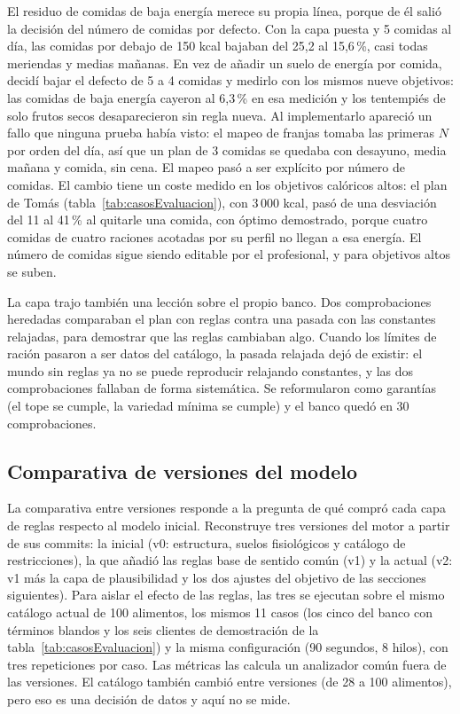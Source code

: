 El residuo de comidas de baja energía merece su propia línea, porque de él salió la decisión del número de comidas por defecto. Con la capa puesta y 5 comidas al día, las comidas por debajo de 150 kcal bajaban del 25,2 al 15,6\,\%, casi todas meriendas y medias mañanas. En vez de añadir un suelo de energía por comida, decidí bajar el defecto de 5 a 4 comidas y medirlo con los mismos nueve objetivos: las comidas de baja energía cayeron al 6,3\,\% en esa medición y los tentempiés de solo frutos secos desaparecieron sin regla nueva. Al implementarlo apareció un fallo que ninguna prueba había visto: el mapeo de franjas tomaba las primeras $N$ por orden del día, así que un plan de 3 comidas se quedaba con desayuno, media mañana y comida, sin cena. El mapeo pasó a ser explícito por número de comidas. El cambio tiene un coste medido en los objetivos calóricos altos: el plan de Tomás (tabla~\ref{tab:casosEvaluacion}), con 3\,000 kcal, pasó de una desviación del 11 al 41\,\% al quitarle una comida, con óptimo demostrado, porque cuatro comidas de cuatro raciones acotadas por su perfil no llegan a esa energía. El número de comidas sigue siendo editable por el profesional, y para objetivos altos se suben.

La capa trajo también una lección sobre el propio banco. Dos comprobaciones heredadas comparaban el plan con reglas contra una pasada con las constantes relajadas, para demostrar que las reglas cambiaban algo. Cuando los límites de ración pasaron a ser datos del catálogo, la pasada relajada dejó de existir: el mundo sin reglas ya no se puede reproducir relajando constantes, y las dos comprobaciones fallaban de forma sistemática. Se reformularon como garantías (el tope se cumple, la variedad mínima se cumple) y el banco quedó en 30 comprobaciones.

\subsection{Comparativa de versiones del modelo}
\label{sec:evalVersiones}

La comparativa entre versiones responde a la pregunta de qué compró cada capa de reglas respecto al modelo inicial. Reconstruye tres versiones del motor a partir de sus commits: la inicial (v0: estructura, suelos fisiológicos y catálogo de restricciones), la que añadió las reglas base de sentido común (v1) y la actual (v2: v1 más la capa de plausibilidad y los dos ajustes del objetivo de las secciones siguientes). Para aislar el efecto de las reglas, las tres se ejecutan sobre el mismo catálogo actual de 100 alimentos, los mismos 11 casos (los cinco del banco con términos blandos y los seis clientes de demostración de la tabla~\ref{tab:casosEvaluacion}) y la misma configuración (90 segundos, 8 hilos), con tres repeticiones por caso. Las métricas las calcula un analizador común fuera de las versiones. El catálogo también cambió entre versiones (de 28 a 100 alimentos), pero eso es una decisión de datos y aquí no se mide.

